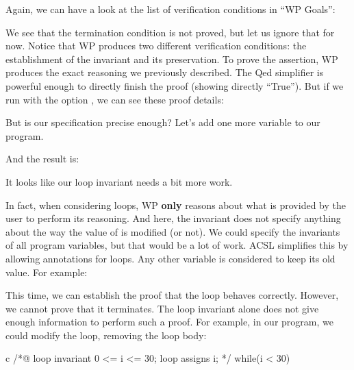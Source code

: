 Again, we can have a look at the list of verification conditions in
``WP Goals'':




We see that the termination condition is not proved, but let us ignore that
for now. Notice that WP produces two different verification conditions: the
establishment of the invariant and its preservation. To prove the
assertion, WP produces the exact
reasoning we previously described. The Qed simplifier is
powerful enough to directly finish the proof (showing directly ``True'').
But if we run with the option , we can see
these proof details:




But is our specification precise enough?
Let's add one more variable to our program.





And the result is:




It looks like our loop invariant needs a bit more work.





In fact, when considering loops, WP \textbf{only} reasons about what is
provided by the user to perform its reasoning. And here, the invariant
does not specify anything about the way the value of  is
modified (or not). We could specify the invariants of all program
variables, but that would be a lot of work. ACSL simplifies this by allowing
 annotations for loops. Any other variable is considered
to keep its old value. For example:






This time, we can establish the proof that the loop behaves correctly.
However, we cannot prove that it terminates. The loop invariant alone
does not give enough information to perform such a proof. For example,
in our program, we could modify the loop, removing the loop body:



\begin{CodeBlock}{c}
/*@
  loop invariant 0 <= i <= 30;
  loop assigns i;
*/
while(i < 30){

}
\end{CodeBlock}




